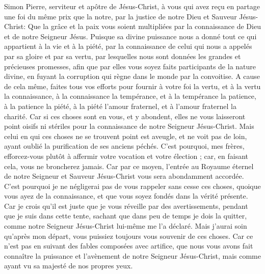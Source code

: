 \begin{multicols}{2}
\VerseOne{}Simon Pierre, serviteur et apôtre de Jésus-Christ, à vous qui avez reçu en partage une foi du même prix que la notre, par la justice de notre Dieu et Sauveur Jésus-Christ:
Que la grâce et la paix vous soient multipliées par la connaissance de Dieu et de notre Seigneur Jésus.
Puisque sa divine puissance nous a donné tout ce qui appartient à la vie et à la piété, par la connaissance de celui qui nous a appelés par sa gloire et par sa vertu,
par lesquelles nous sont données les grandes et précieuses promesses, afin que par elles vous soyez faits participants de la nature divine, en fuyant la corruption qui règne dans le monde par la convoitise.
A cause de cela même, faites tous vos efforts pour fournir à votre foi la vertu, et à la vertu la connaissance,
à la connaissance la tempérance, et à la tempérance la patience, à la patience la piété,
à la piété l'amour fraternel, et à l'amour fraternel la charité.
Car si ces choses sont en vous, et y abondent, elles ne vous laisseront point oisifs ni stériles pour la connaissance de notre Seigneur Jésus-Christ.
Mais celui en qui ces choses ne se trouvent point est aveugle, et ne voit pas de loin, ayant oublié la purification de ses anciens péchés.
C'est pourquoi, mes frères, efforcez-vous plutôt à affermir votre vocation et votre élection ; car, en faisant cela, vous ne broncherez jamais.
Car par ce moyen, l'entrée au Royaume éternel de notre Seigneur et Sauveur Jésus-Christ vous sera abondamment accordée.
C'est pourquoi je ne négligerai pas de vous rappeler sans cesse ces choses, quoique vous ayez de la connaissance, et que vous soyez fondés dans la vérité présente.
Car je crois qu'il est juste que je vous réveille par des avertissements, pendant que je suis dans cette tente,
sachant que dans peu de temps je dois la quitter, comme notre Seigneur Jésus-Christ lui-même me l'a déclaré.
Mais j'aurai soin qu'après mon départ, vous puissiez toujours vous souvenir de ces choses.
Car ce n'est pas en suivant des fables composées avec artifice, que nous vous avons fait connaître la puissance et l'avènement de notre Seigneur Jésus-Christ, mais comme ayant vu sa majesté de nos propres yeux.

\end{multicols}
